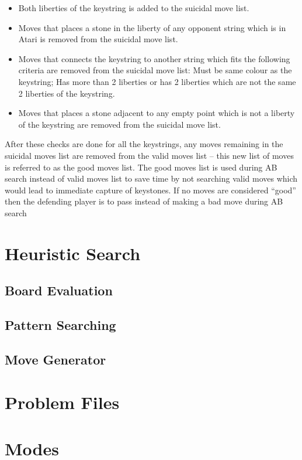 \documentclass{l4proj}
\begin{document}
\begin{itemize}
	\item Both liberties of the keystring is added to the suicidal move list.
	\item Moves that places a stone in the liberty of any opponent string which is in Atari is removed from the suicidal move list.
    \item Moves that connects the keystring to another string which fits the following criteria are removed from the suicidal move list: Must be same colour as the keystring; Has more than 2 liberties or has 2 liberties which are not the same 2 liberties of the keystring.
    \item Moves that places a stone adjacent to any empty point which is not a liberty of the keystring are removed from the suicidal move list.
\end{itemize}

After these checks are done for all the keystrings, any moves remaining in the suicidal moves list are removed from the valid moves list – this new list of moves is referred to as the good moves list. The good moves list is used during AB search instead of valid moves list to save time by not searching valid moves which would lead to immediate capture of keystones. If no moves are considered “good” then the defending player is to pass instead of making a bad move during AB search


\section{Heuristic Search}
\subsection{Board Evaluation}
\subsection{Pattern Searching}
\subsection{Move Generator}

\section{Problem Files}

\section{Modes}
\end{document}
